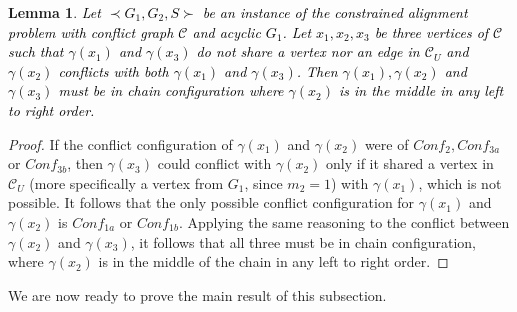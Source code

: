 \documentclass[final]{dmtcs-episciences}
\newtheorem{lemma}[theorem]{Lemma}
\newcommand\mar[1]{\textcolor{black}{#1}}
\begin{document}
\begin{lemma}
\label{threeinchain}
\mar{Let $\prec G_1,G_2,S \succ$ be an instance of the constrained alignment problem with conflict graph $\mathcal{C}$ and acyclic $G_1$. Let $x_1,x_2,x_3$ be three vertices of $\mathcal{C}$ such that $\gamma(x_1)$ and $\gamma(x_3)$ do not share a vertex nor an edge in $\mathcal{C}_U$ and $\gamma(x_2)$ conflicts  with both $\gamma(x_1)$ and $\gamma(x_3)$. Then $\gamma(x_1), \gamma(x_2)$ and $\gamma(x_3)$ must be in chain configuration where $\gamma(x_2)$ is in the middle in any left to right order.}  
\end{lemma}
\begin{proof}
If 
the conflict configuration of $\gamma(x_1)$ and $\gamma(x_2)$ were of $Conf_{2}, Conf_{3a}$ or $Conf_{3b}$, then $\gamma(x_3)$ could conflict with 
 $\gamma(x_2)$ only if it 
shared a vertex in $\mathcal{C}_U$ (more specifically a vertex from $G_1$, since $m_2=1$) with $\gamma(x_1)$, which is not possible. 
It follows that the only possible conflict configuration for 
 $\gamma(x_1)$ and $\gamma(x_2)$ 
is $ Conf_{1a}$ or $Conf_{1b}$. Applying the same reasoning to the conflict between $\gamma(x_2)$ and $\gamma(x_3)$, it follows that 
all three must be in chain configuration, where $\gamma(x_2)$ is in the middle of the chain in any left to right order. 
\end{proof}


We are now ready to prove the main result of this subsection.
\end{document}
